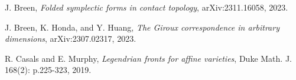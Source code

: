 \documentclass[11pt]{amsart}
\begin{document}
\begin{thebibliography}{}
\begin{comment}
\bibitem[BEHW03]{SFTCompactness}
F. Bourgeois, Y. Eliashberg, H. Hofer, and K. Wysocki, \textit{Compactness results in symplectic field theory}, Geom. Topol., Volume 7, Number 2, p.799-888, 2003.

\bibitem[BN10]{AlgebraicallyOvertwisted}
F. Bourgeois and K. Niederkr{\"u}ger, Towards a good definition of algebraically overtwisted,
Expo. Math. 28, no. 1, 85–100, 2010.

\bibitem[BO09a]{BO:MorseBott}
F. Bourgeois and A. Oancea, \textit{Symplectic homology, autonomous Hamiltonians, and Morse–Bott moduli spaces}, Duke Math. J. 146, p.71–174, 2009.

\bibitem[BO09b]{BO:ExactSequence}
F. Bourgeois and A. Oancea, \textit{An exact sequence for contact- and symplectic homology},
Invent. math., Volume 175, p. 611–680, 2009.

\bibitem[BT82]{BottTu}
R. Bott and L. R. Tu, \textit{Differential forms in algebraic topology}, Graduate Texts in Mathematics 82, Springer-Verlag, 1982.
\end{comment}

J. Breen, \textit{Folded symplectic forms in contact topology}, arXiv:2311.16058, 2023.

J. Breen, K. Honda, and Y. Huang, \textit{The Giroux correspondence in arbitrary dimensions}, arXiv:2307.02317, 2023.

\begin{comment}
\bibitem[CGKS14]{CGKS:Polyfilling}
C. Cao, N. Gallup, K. Hayden, J. M. Sabloff, \textit{Topologically Distinct Lagrangian and Symplectic Fillings}, Math. Research Letters, Vol. 21, p.85-99, 2014.

\bibitem[CMP19]{CMP:OT}
R. Casals, E. Murphy, and F. Presas, \textit{Geometric criteria for overtwistedness}, J. Amer. Math. Soc. 32, p.563–604, 2019.
\end{comment}

R. Casals and E. Murphy, \textit{Legendrian fronts for affine varieties}, Duke Math. J. 168(2): p.225-323, 2019.


\begin{comment}
\bibitem[CG86]{CG:Cobordisms}
A. Casson, C. M. Gordon, \textit{Cobordism of classical knots}, from: "{\'A} la recherche de la topologie perdue" (editors L Guillou, A Marin), Progr. Math. 62, Birkh{\"a}user 181, 1986.

\bibitem[CDGG20]{Cthulu}
B. Chantraine, G. Dimitroglou Rizell, P. Ghiggini, and R. Golovko, \textit{Floer theory for Lagrangian cobordisms}, J. Differential Geom. 114 no. 3, p.393–465, 2020.


\end{comment}
\end{thebibliography}
\end{document}
